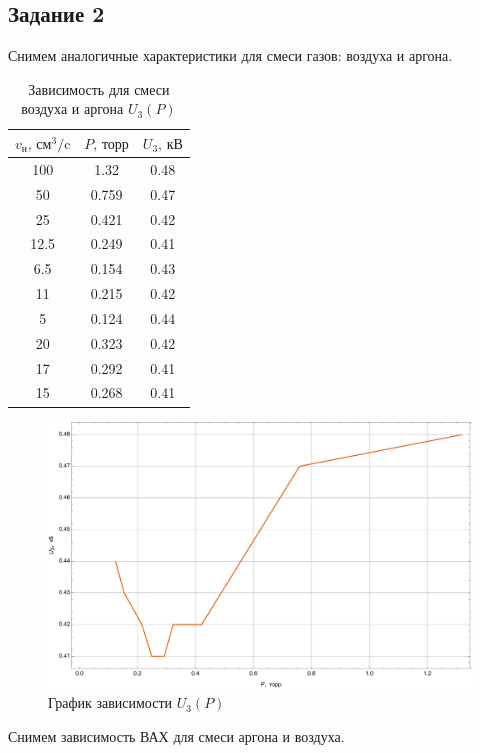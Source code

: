 \documentclass[a4paper, 12pt]{article}
\begin{document}
\subsection{Задание 2}
Снимем аналогичные характеристики для смеси газов: воздуха и аргона.
\begin{table}[h!]
\centering
\begin{tabular}{|c|c|c|}
\hline
$v_\text{н}\text{, см}^3\text{/c}$ & $P\text{, торр}$ & $U_3\text{, кВ}$ \\
\hline
100 & 1.32 & 0.48 \\
\hline
50 & 0.759 & 0.47 \\
\hline
25 & 0.421 & 0.42 \\
\hline
12.5 & 0.249 & 0.41 \\
\hline
6.5 & 0.154 & 0.43 \\
\hline
11 & 0.215 & 0.42 \\
\hline
5 & 0.124 & 0.44 \\
\hline
20 & 0.323 & 0.42 \\
\hline
17 & 0.292 & 0.41 \\
\hline
15 & 0.268 & 0.41 \\
\hline
\end{tabular}
\caption{Зависимость для смеси воздуха и аргона $U_3\left(P\right)$}
\end{table}
\begin{figure}[h!]
\centering
\includegraphics[scale=0.5]{MyGraph3.pdf}
\caption{График зависимости $U_3\left(P\right)$}
\end{figure}
\par
Снимем зависимость ВАХ для смеси аргона и воздуха.
\end{document}
